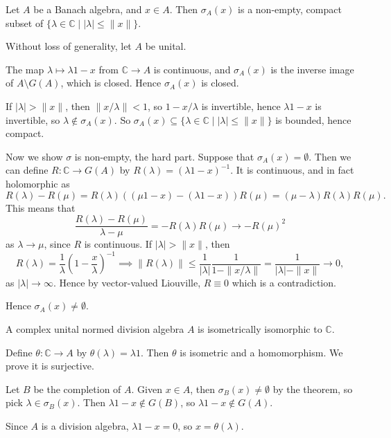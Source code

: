 \documentclass[12pt]{article}
\begin{document}

\begin{theorem}
	Let $A$ be a Banach algebra, and $x \in A$. Then $\sigma_A(x)$ is a non-empty, compact subset of $\{\lambda \in \mathbb{C} \mid |\lambda| \leq \|x\|\}$.
\end{theorem}

\begin{proofbox}
	Without loss of generality, let $A$ be unital.

	The map $\lambda \mapsto \lambda 1 - x$ from $\mathbb{C} \to A$ is continuous, and $\sigma_A(x)$ is the inverse image of $A \setminus G(A)$, which is closed. Hence $\sigma_A(x)$ is closed.

	If $|\lambda| > \|x\|$, then $\|x/\lambda\| < 1$, so $1 - x/\lambda$ is invertible, hence $\lambda 1 - x$ is invertible, so $\lambda \not \in \sigma_A(x)$. So $\sigma_A(x) \subseteq \{\lambda \in \mathbb{C} \mid |\lambda| \leq \|x\|\}$ is bounded, hence compact.

	Now we show $\sigma$ is non-empty, the hard part. Suppose that $\sigma_A(x) = \emptyset$. Then we can define $R : \mathbb{C} \to G(A)$ by $R(\lambda) = (\lambda 1 - x)^{-1}$. It is continuous, and in fact holomorphic as
	\[
	R(\lambda) - R(\mu) = R(\lambda)\left( ( \mu 1 - x) - (\lambda 1 - x) \right) R(\mu) = (\mu - \lambda) R(\lambda) R(\mu).
	\]
	This means that
	\[
	\frac{R(\lambda) - R(\mu)}{\lambda - \mu} = - R(\lambda) R(\mu) \to - R(\mu)^2
	\]
	as $\lambda \to \mu$, since $R$ is continuous. If $|\lambda| > \|x\|$, then
	\[
	R(\lambda) = \frac{1}{\lambda} \left(1 - \frac x\lambda\right)^{-1} \implies \|R(\lambda)\| \leq \frac{1}{|\lambda|} \frac{1}{1 - \|x/\lambda\|} = \frac{1}{|\lambda| - \|x\|} \to 0,
	\]
	as $|\lambda| \to \infty$. Hence by vector-valued Liouville, $R \equiv 0$ which is a contradiction.

	Hence $\sigma_A(x) \neq \emptyset$.
\end{proofbox}

\begin{corollary}
	A complex unital normed division algebra $A$ is isometrically isomorphic to $\mathbb{C}$.
\end{corollary}

\begin{proofbox}
	 Define $\theta : \mathbb{C} \to A$ by $\theta(\lambda) = \lambda 1$. Then $\theta$ is isometric and a homomorphism. We prove it is surjective.

	 Let $B$ be the completion of $A$. Given $x \in A$, then $\sigma_B(x) \neq \emptyset$ by the theorem, so pick $\lambda \in \sigma_B(x)$. Then $\lambda 1 - x \not \in G(B)$, so $\lambda 1 - x \not \in G(A)$.

	 Since $A$ is a division algebra, $\lambda 1 - x = 0$, so $x = \theta(\lambda)$.
\end{proofbox}
\end{document}
